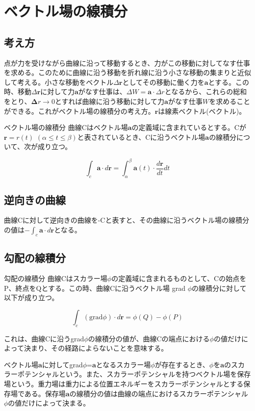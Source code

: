\documentclass[dvipdfmx]{jsarticle}
\begin{document}
\section{ベクトル場の線積分}

\subsection{考え方}

点が力を受けながら曲線に沿って移動するとき、力がこの移動に対してなす仕事を求める。このために曲線に沿う移動を折れ線に沿う小さな移動の集まりと近似して考える。小さな移動をベクトル$\Delta \bm r$としてその移動に働く力を$\bm a$とする。この時、移動$\Delta \bm r$に対して力$\bm a$がなす仕事は、$\Delta W = \bm a \cdot \Delta r$となるから、これらの総和をとり、$\bm \Delta r \to 0$とすれば曲線に沿う移動に対して力$\bm a$がなす仕事$W$を求めることができる。これがベクトル場の線積分の考え方。$\bm r$は線素ベクトル(ベクトル)。

\begin{mysimplebox}{ベクトル場の線積分}
曲線Cはベクトル場$\bm a$の定義域に含まれているとする。Cが$\bm r=r$$(t)$ $(\alpha \le t \le \beta)$と表されているとき、Cに沿うベクトル場$\bm a$の線積分について、次が成り立つ。

\begin{equation}
\displaystyle \int_c {\bm a} \cdot d{\bm r}=\int_{\alpha}^{\beta}{\bm a}(t)\cdot \frac{d\bm r}{dt}dt
\end{equation}

\end{mysimplebox}


\subsection{逆向きの曲線}

曲線Cに対して逆向きの曲線を-Cと表すと、その曲線に沿うベクトル場の線積分の値は$\displaystyle -\int_c {\bm a} \cdot d\bm r$となる。

\subsection{勾配の線積分}
 
\begin{mysimplebox}{勾配の線積分}
曲線Cはスカラー場$\phi$の定義域に含まれるものとして、Cの始点をP、終点をQとする。この時、曲線Cに沿うベクトル場
grad $\phi$の線積分に対して以下が成り立つ。 

\begin{equation}
\displaystyle \int_c (\mathrm{grad}\phi)\cdot d{\bm r}=\phi(Q)-\phi(P)
\end{equation}

\end{mysimplebox}

これは、曲線Cに沿うgrad$\phi$の線積分の値が、曲線Cの端点における$\phi$の値だけによって決まり、その経路によらないことを意味する。

ベクトル場$\bm a$に対してgrad$\phi$=$\bm a$となるスカラー場$\phi$が存在するとき、$\phi$を$\bm a$のスカラーポテンシャルという。また、スカラーポテンシャルを持つベクトル場を保存場という。重力場は重力による位置エネルギーをスカラーポテンシャルとする保存場である。保存場$\bm a$の線積分の値は曲線の端点におけるスカラーポテンシャル$\phi$の値だけによって決まる。
\end{document}
